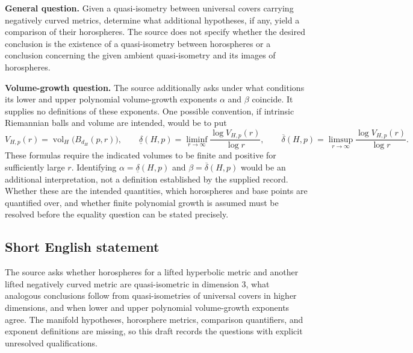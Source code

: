 \documentclass[11pt]{article}
\begin{document}
\textbf{General question.} Given a quasi-isometry between universal covers carrying negatively curved metrics, determine what additional hypotheses, if any, yield a comparison of their horospheres. The source does not specify whether the desired conclusion is the existence of a quasi-isometry between horospheres or a conclusion concerning the given ambient quasi-isometry and its images of horospheres.

\textbf{Volume-growth question.} The source additionally asks under what conditions its lower and upper polynomial volume-growth exponents \(\alpha\) and \(\beta\) coincide. It supplies no definitions of these exponents. One possible convention, if intrinsic Riemannian balls and volume are intended, would be to put
\[
 V_{H,p}(r)=\operatorname{vol}_H\bigl(B_{d_H}(p,r)\bigr),\qquad
 \underline\delta(H,p)=\liminf_{r\to\infty}\frac{\log V_{H,p}(r)}{\log r},\qquad
 \overline\delta(H,p)=\limsup_{r\to\infty}\frac{\log V_{H,p}(r)}{\log r}.
\]
These formulas require the indicated volumes to be finite and positive for sufficiently large \(r\). Identifying \(\alpha=\underline\delta(H,p)\) and \(\beta=\overline\delta(H,p)\) would be an additional interpretation, not a definition established by the supplied record. Whether these are the intended quantities, which horospheres and base points are quantified over, and whether finite polynomial growth is assumed must be resolved before the equality question can be stated precisely.
\subsection{Short English statement}
The source asks whether horospheres for a lifted hyperbolic metric and another lifted negatively curved metric are quasi-isometric in dimension \(3\), what analogous conclusions follow from quasi-isometries of universal covers in higher dimensions, and when lower and upper polynomial volume-growth exponents agree. The manifold hypotheses, horosphere metrics, comparison quantifiers, and exponent definitions are missing, so this draft records the questions with explicit unresolved qualifications.
\end{document}
